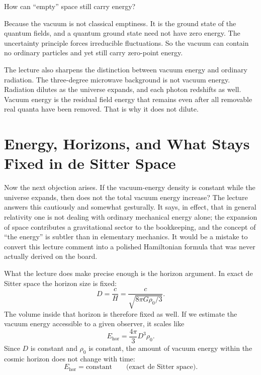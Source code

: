 How can ``empty'' space still carry energy?

Because the vacuum is not classical emptiness. It is the ground state of the quantum fields, and a quantum ground state need not have zero energy. The uncertainty principle forces irreducible fluctuations. So the vacuum can contain no ordinary particles and yet still carry zero-point energy.

The lecture also sharpens the distinction between vacuum energy and ordinary radiation. The three-degree microwave background is not vacuum energy. Radiation dilutes as the universe expands, and each photon redshifts as well. Vacuum energy is the residual field energy that remains even after all removable real quanta have been removed. That is why it does not dilute.

\section{Energy, Horizons, and What Stays Fixed in de Sitter Space}

Now the next objection arises. If the vacuum-energy density is constant while the universe expands, then does not the total vacuum energy increase? The lecture answers this cautiously and somewhat gesturally. It says, in effect, that in general relativity one is not dealing with ordinary mechanical energy alone; the expansion of space contributes a gravitational sector to the bookkeeping, and the concept of ``the energy'' is subtler than in elementary mechanics. It would be a mistake to convert this lecture comment into a polished Hamiltonian formula that was never actually derived on the board.

What the lecture does make precise enough is the horizon argument. In exact de Sitter space the horizon size is fixed:
\begin{equation}
D=\frac{c}{H}
=\frac{c}{\sqrt{8\pi G\rho_0/3}}.
\end{equation}
The volume inside that horizon is therefore fixed as well. If we estimate the vacuum energy accessible to a given observer, it scales like
\begin{equation}
E_{\mathrm{hor}}=\frac{4\pi}{3}D^3\rho_0.
\end{equation}
Since \(D\) is constant and \(\rho_0\) is constant, the amount of vacuum energy within the cosmic horizon does not change with time:
\begin{equation}
E_{\mathrm{hor}}=\text{constant}
\qquad
\text{(exact de Sitter space).}
\end{equation}

